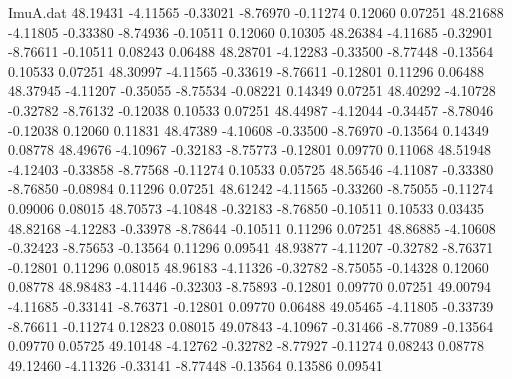 \begin{filecontents}{ImuA.dat}
  48.19431   -4.11565   -0.33021   -8.76970   -0.11274    0.12060    0.07251
  48.21688   -4.11805   -0.33380   -8.74936   -0.10511    0.12060    0.10305
  48.26384   -4.11685   -0.32901   -8.76611   -0.10511    0.08243    0.06488
  48.28701   -4.12283   -0.33500   -8.77448   -0.13564    0.10533    0.07251
  48.30997   -4.11565   -0.33619   -8.76611   -0.12801    0.11296    0.06488
  48.37945   -4.11207   -0.35055   -8.75534   -0.08221    0.14349    0.07251
  48.40292   -4.10728   -0.32782   -8.76132   -0.12038    0.10533    0.07251
  48.44987   -4.12044   -0.34457   -8.78046   -0.12038    0.12060    0.11831
  48.47389   -4.10608   -0.33500   -8.76970   -0.13564    0.14349    0.08778
  48.49676   -4.10967   -0.32183   -8.75773   -0.12801    0.09770    0.11068
  48.51948   -4.12403   -0.33858   -8.77568   -0.11274    0.10533    0.05725
  48.56546   -4.11087   -0.33380   -8.76850   -0.08984    0.11296    0.07251
  48.61242   -4.11565   -0.33260   -8.75055   -0.11274    0.09006    0.08015
  48.70573   -4.10848   -0.32183   -8.76850   -0.10511    0.10533    0.03435
  48.82168   -4.12283   -0.33978   -8.78644   -0.10511    0.11296    0.07251
  48.86885   -4.10608   -0.32423   -8.75653   -0.13564    0.11296    0.09541
  48.93877   -4.11207   -0.32782   -8.76371   -0.12801    0.11296    0.08015
  48.96183   -4.11326   -0.32782   -8.75055   -0.14328    0.12060    0.08778
  48.98483   -4.11446   -0.32303   -8.75893   -0.12801    0.09770    0.07251
  49.00794   -4.11685   -0.33141   -8.76371   -0.12801    0.09770    0.06488
  49.05465   -4.11805   -0.33739   -8.76611   -0.11274    0.12823    0.08015
  49.07843   -4.10967   -0.31466   -8.77089   -0.13564    0.09770    0.05725
  49.10148   -4.12762   -0.32782   -8.77927   -0.11274    0.08243    0.08778
  49.12460   -4.11326   -0.33141   -8.77448   -0.13564    0.13586    0.09541
\end{filecontents}
